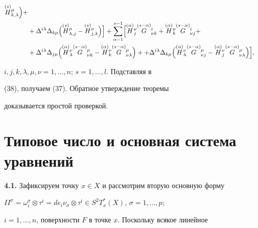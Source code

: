 \begin{pf}
\begin{align*}
\sv{(s)}H^{\mu}_{k,\lambda}\Bigr)+\\


%


&+\Delta^{i\lambda}\Delta_{k\mu}


\Bigl(\sv{(s)}H^{\mu}_{\lambda,j}-\sv{(s)}H^{\mu}_{j,\lambda}


\Bigr)\Bigr]+


\sum_{\alpha=1}^{s-1}\Bigl[\sv{(\alpha)}H^{\nu}_j


\sv{(s-\alpha)}G^i_{\nu k}+\sv{(\alpha)}H^{\nu}_k


\sv{(s-\alpha)}G^i_{\nu j}+\\


%


&+\Delta^{i\lambda}\Delta_{j\mu}\Bigl(


\sv{(\alpha)}H^{\nu}_{\lambda}\sv{(s-\alpha)}G^{\mu}_{\nu k}-


\sv{(\alpha)}H^{\nu}_k\sv{(s-\alpha)}G^{\mu}_{\nu\lambda}\Bigr)+


+\Delta^{i\lambda}\Delta_{k\mu}\Bigl(


\sv{(\alpha)}H^{\nu}_{\lambda}\sv{(s-\alpha)}G^{\mu}_{\nu j}-


\sv{(\alpha)}H^{\nu}_j\sv{(s-\alpha)}G^{\mu}_{\nu\lambda}\Bigr)\Bigr],


\end{align*}


$i,j,k,\lambda,\mu,\nu=1,\dotsc,n$; $s=1,\dotsc,l$. Подставляя в


(38), получаем (37). Обратное утверждение теоремы


доказывается простой проверкой.


\end{pf}





\section{Типовое число и основная система уравнений}





{\bf 4.1.} Зафиксируем точку $x\in X$ и рассмотрим вторую основную форму


$II^{\sigma}=\omega^{\sigma}_i\otimes\tau^i=de_i\nu_{\sigma}


\otimes\tau^i\in S^2T^*_x(X)$, $\sigma=1,\dotsc,p$;


$i=1,\dotsc,n$, поверхности $F$ в точке $x$. Поскольку всякое линейное


